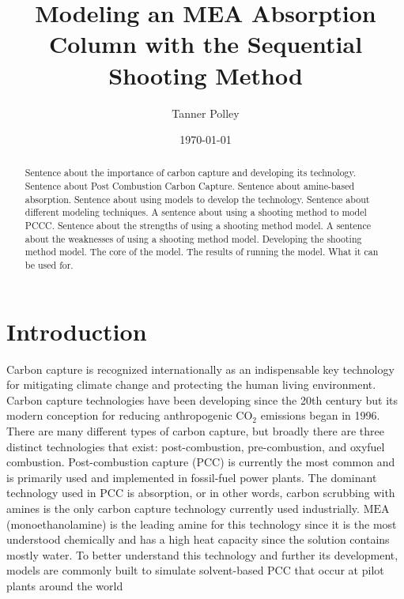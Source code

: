 \documentclass[12pt, letterpaper]{article}
\title{Modeling an MEA Absorption Column with the Sequential Shooting Method}
\author{Tanner Polley}
\date{\today}
\begin{document}
    \maketitle
    \begin{abstract}
        Sentence about the importance of carbon capture and developing its technology.
        Sentence about Post Combustion Carbon Capture.
        Sentence about amine-based absorption.
        Sentence about using models to develop the technology.
        Sentence about different modeling techniques.
        A sentence about using a shooting method to model PCCC. Sentence about the strengths of using a shooting method model.
        A sentence about the weaknesses of using a shooting method model.
        Developing the shooting method model.
            The core of the model.
            The results of running the model.
            What it can be used for.
    \end{abstract}
    
    \newpage
    \tableofcontents
    \newpage
    
    \section{Introduction}\label{sec:introduction}
        Carbon capture is recognized internationally as an indispensable key technology for mitigating climate change and protecting the human living environment.
        Carbon capture technologies have been developing since the 20th century but its modern conception for reducing anthropogenic $\mathrm{CO}_2$ emissions began in 1996.
        There are many different types of carbon capture, but broadly there are three distinct technologies that exist:
        post-combustion, pre-combustion, and oxyfuel combustion.
        Post-combustion capture (PCC) is currently the most common and is primarily used and implemented in fossil-fuel power plants.
        The dominant technology used in PCC is absorption, or in other words, carbon scrubbing with amines is the only carbon capture technology currently used industrially.
        $\mathrm{MEA}$ (monoethanolamine) is the leading amine for this technology since it is the most understood chemically and has a high heat capacity since the solution contains mostly water.
        To better understand this technology and further its development, models are commonly built to simulate solvent-based PCC that occur at pilot plants around the world
    
\end{document}
